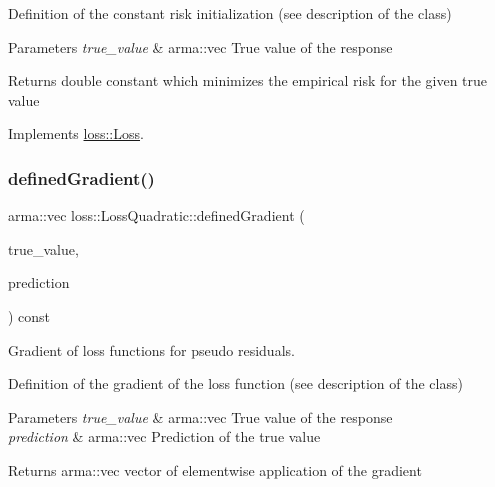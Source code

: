 Definition of the constant risk initialization (see description of the class)


\begin{DoxyParams}{Parameters}
{\em true\+\_\+value} & {\ttfamily arma\+::vec} True value of the response\\
\hline
\end{DoxyParams}
\begin{DoxyReturn}{Returns}
{\ttfamily double} constant which minimizes the empirical risk for the given true value 
\end{DoxyReturn}


Implements \hyperlink{classloss_1_1_loss_a65fe7dcd9370e6a549b8d1cc95fc8798}{loss\+::\+Loss}.

\mbox{\label{classloss_1_1_loss_quadratic_ad8b03123e260e2f034e507fff9695604}} 
\subsubsection{\texorpdfstring{defined\+Gradient()}{definedGradient()}}
{\footnotesize\ttfamily arma\+::vec loss\+::\+Loss\+Quadratic\+::defined\+Gradient (\begin{DoxyParamCaption}\item[{const arma\+::vec \&}]{true\+\_\+value,  }\item[{const arma\+::vec \&}]{prediction }\end{DoxyParamCaption}) const\hspace{0.3cm}{\ttfamily [virtual]}}



Gradient of loss functions for pseudo residuals. 

Definition of the gradient of the loss function (see description of the class)


\begin{DoxyParams}{Parameters}
{\em true\+\_\+value} & {\ttfamily arma\+::vec} True value of the response \\
\hline
{\em prediction} & {\ttfamily arma\+::vec} Prediction of the true value\\
\hline
\end{DoxyParams}
\begin{DoxyReturn}{Returns}
{\ttfamily arma\+::vec} vector of elementwise application of the gradient 
\end{DoxyReturn}


